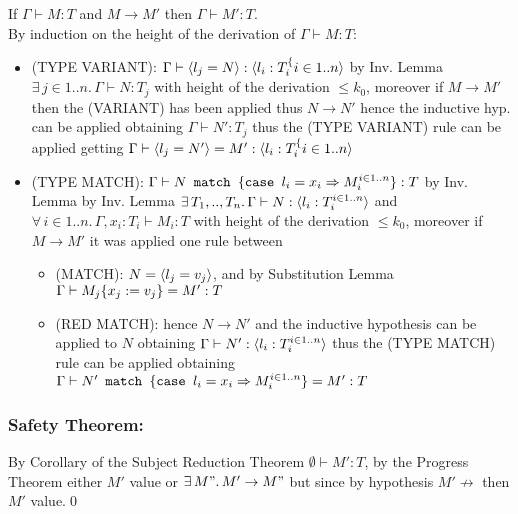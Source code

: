 If $\Gamma \vdash M: T$ and $M \to M'$ then $\Gamma \vdash M': T$.\\
By induction on the height of the derivation of $\Gamma \vdash M: T$:\\
\begin{itemize}
	\item (TYPE VARIANT): $\Gamma \vdash \langle l_j=N \rangle: \langle l_i: T_i^\{i \in 1..n \rangle$ by Inv. Lemma
	      $\exists\, j \in 1..n.\,\Gamma \vdash N: T_j$ with height of the derivation $\le k_0$,
	      moreover if $M \to M'$ then the (VARIANT) has been applied thus $N \to N'$ hence the
	      inductive hyp. can be applied obtaining $\Gamma \vdash N': T_j$ thus the (TYPE VARIANT)
	      rule can be applied getting $\Gamma \vdash \langle l_j=N' \rangle = M': \langle l_i: T_i^\{i \in 1..n \rangle$
	\item (TYPE MATCH): $\Gamma \vdash N\texttt{ match }\{\texttt{case }l_i = x_i \Rightarrow M_i^{i \in 1..n}\}: T$ by Inv. Lemma
	      by Inv. Lemma $\exists\, T_1,..,T_n.\, \Gamma \vdash N: \langle l_i: T_i^{i \in 1..n} \rangle$
	      and $\forall\, i \in 1..n.\, \Gamma, x_i: T_i \vdash M_i: T$ with height of the
	      derivation $\le k_0$, moreover if $M \to M'$ it was applied one rule between
	      \begin{itemize}
		      \item (MATCH): $N = \langle l_j=v_j \rangle$, and by Substitution Lemma
		            $\Gamma \vdash M_j\{x_j:=v_j\} = M': T$
		      \item (RED MATCH): hence $N \to N'$ and the inductive hypothesis can be applied to
		            $N$ obtaining $\Gamma \vdash N': \langle l_i: T_i^{i \in 1..n} \rangle$ thus the
		            (TYPE MATCH) rule can be applied obtaining
		            $\Gamma \vdash N'\texttt{ match }\{\texttt{case }l_i = x_i \Rightarrow M_i^{i \in 1..n}\} = M': T$
	      \end{itemize}
\end{itemize}

\subsubsection*{Safety Theorem:}

By Corollary of the Subject Reduction Theorem $\emptyset \vdash M': T$, by the Progress Theorem
either $M'$ value or $\exists\, M".\, M' \to M"$ but since by hypothesis $M' \not\to$ then
$M'$ value.\qed

